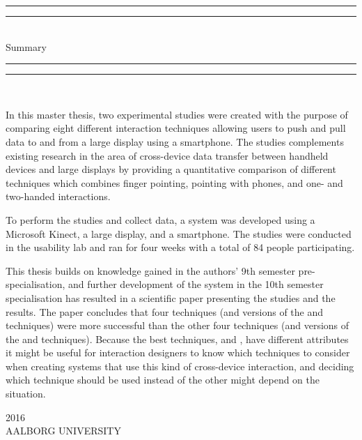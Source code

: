 \begin{dummy}

	\textheight
	\centering
	\vspace*{\baselineskip}
	\rule{\textwidth}{2pt}\vspace*{-\baselineskip}\vspace*{2pt}
	\rule{\textwidth}{0.4pt}\\[\baselineskip]
	{\LARGE Summary}\\[0.2\baselineskip]
	\rule{\textwidth}{0.4pt}\vspace*{-\baselineskip}\vspace{3.2pt}
	\rule{\textwidth}{2pt}\\[\baselineskip]
	\scshape
	{} \par
	\vspace*{2\baselineskip}
	\vspace*{2\baselineskip}

\begin{summary}
In this master thesis, two experimental studies were created with the purpose of comparing eight different interaction techniques allowing users to push and pull data to and from a large display using a smartphone.
The studies complements existing research in the area of cross-device data transfer between handheld devices and large displays by providing a quantitative comparison of different techniques which combines finger pointing, pointing with phones, and one- and two-handed interactions.

To perform the studies and collect data, a system was developed using a Microsoft Kinect, a large display, and a smartphone.
The studies were conducted in the usability lab and ran for four weeks with a total of 84 people participating. 

This thesis builds on knowledge gained in the authors' 9th semester pre-specialisation, and further development of the system in the 10th semester specialisation has resulted in a scientific paper presenting the studies and the results.
The paper concludes that four techniques (\pull and \push versions of the \swipe and \throw techniques) were more successful than the other four techniques (\pull and \push versions of the \grab and \tilt techniques).
Because the best techniques, \swipe and \throw, have different attributes it might be useful for interaction designers to know which techniques to consider when creating systems that use this kind of cross-device interaction, and deciding which technique should be used instead of the other might depend on the situation.
\end{summary}
	\vspace*{2\baselineskip}
		{\scshape 2016} \\
		{\large AALBORG UNIVERSITY}\par
	
\end{dummy}